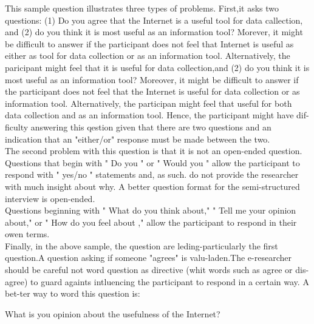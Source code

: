 \documentclass[a4paper]{book}
\begin{document}
\vspace{2mm}
This sample question illustrates three types of problems. First,it asks two questions: (1) Do you agree that the Internet is a useful tool for data callection, and (2) do you think it is most useful as an information tool? Morever, it might be difficult to answer if the participant does not feel that Internet is useful as either as tool for data collection or as an information tool. Alternatively, the paricipant might feel that it is useful for data collection,and (2) do you think it is most useful as an information tool? Moreover, it might be difficult to answer if the participant does not feel that the Internet is useful for data collection or as information tool. Alternatively, the participan might feel that useful for both data collection and as an information tool. Hence, the participant might have dif-ficulty answering this qestion given that there are two questions and an indication that an "either/or" response must be made between the two.\\
The second problem with this question is that it is not an open-ended question.\\
Questions that begin with " Do you " or " Would you " allow the participant to respond with " yes/no " statements and, as such. do not provide the researcher with much insight about why. A better question format for the semi-structured interview is open-ended.\\
Questions beginning with " What do you think about," " Tell me your opinion about," or " How do you feel about ," allow the participant to respond in their owen terms.\\
Finally, in the above sample, the question are leding-particularly the first question.A question asking if someone "agrees" is valu-laden.The e-researcher should be careful not word question as directive (whit words such as agree or dis-agree) to guard againts intluencing the participant to respond in a certain way. A bet-ter way to word this question is:\\

\vspace{2mm}
\begin{center}
What is you opinion about the usefulness of the Internet?
\end{center}
\end{document}
